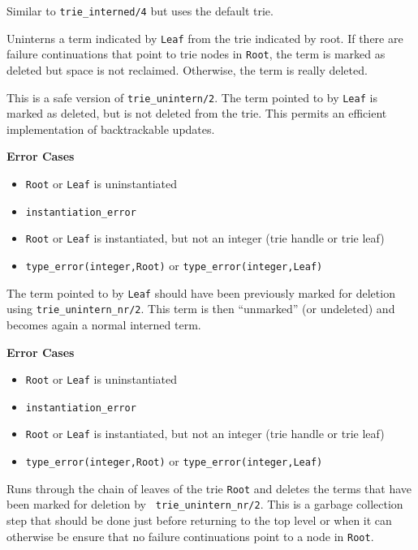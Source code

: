 {\begin{description}
 
Similar to {\tt trie\_interned/4}  but uses the default trie.

 
Uninterns a term indicated by {\tt Leaf} from the trie indicated by
root.  If there are failure continuations that point to trie nodes in
{\tt Root}, the term is marked as deleted but space is not reclaimed.
Otherwise, the term is really deleted.

This is a safe version of {\tt trie\_unintern/2}. The term pointed to by
{\tt Leaf} is marked as deleted, but is not deleted from the trie. This
permits an efficient implementation of backtrackable updates.

{\bf Error Cases}
\begin{itemize}
\item 	{\tt Root} or {\tt Leaf} is uninstantiated
\bi
\item 	 {\tt instantiation\_error}
\ei
\item 	{\tt Root} or {\tt Leaf} is instantiated, but not an integer
  (trie handle or trie leaf) 
\bi
\item 	 {\tt type\_error(integer,Root)} or {\tt type\_error(integer,Leaf)}
\ei
\end{itemize}

The term pointed to by {\tt Leaf} should have been previously marked for
deletion using
{\tt trie\_unintern\_nr/2}. This term is then ``unmarked'' (or undeleted)
and becomes again a normal interned term.

{\bf Error Cases}
\begin{itemize}
\item 	{\tt Root} or {\tt Leaf} is uninstantiated
\bi
\item 	 {\tt instantiation\_error}
\ei
\item 	{\tt Root} or {\tt Leaf} is instantiated, but not an integer
  (trie handle or trie leaf) 
\bi
\item 	 {\tt type\_error(integer,Root)} or {\tt type\_error(integer,Leaf)}
\ei
\end{itemize}

Runs through the chain of leaves of the trie {\tt Root} and deletes
the terms that have been marked for deletion by {\tt
  trie\_unintern\_nr/2}. This is a garbage collection step that should
be done just before returning to the top level or when it can
otherwise be ensure that no failure continuations point to a node in
{\tt Root}.


\end{description}}

